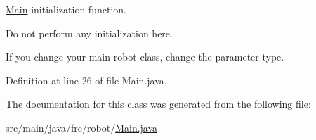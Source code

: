 \hyperlink{classfrc_1_1robot_1_1Main}{Main} initialization function. 

Do not perform any initialization here.

If you change your main robot class, change the parameter type. 

Definition at line 26 of file Main.\+java.



The documentation for this class was generated from the following file\+:\begin{DoxyCompactItemize}
\item 
src/main/java/frc/robot/\hyperlink{Main_8java}{Main.\+java}\end{DoxyCompactItemize}
